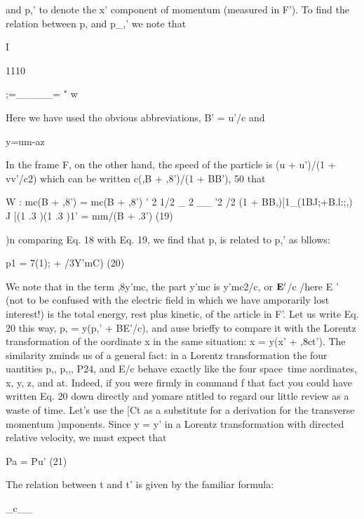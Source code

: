 and p,' to denote the x' component of momentum (measured in F').
To find the relation between p, and p_,' we note that

I

1110

;=_____= " w

Here we have used the obvious abbreviations, B' = u'/c and

y=um-az

In the frame F, on the other hand, the speed of the particle is
(u + u')/(1 + vv'/c2) which can be written c(,B + ,8')/(1 + BB'),
50 that
\begin{equation}
\end{equation}

W : mc(B + ,8') = mc(B + ,8')
' 2 1/2 _ 2 __ '2 /2
(1 + BB,)[1_(1BJ;+B.l:;,) J [(1 .3 )(1 .3 )1'
= mm/(B + .3') (19)
\begin{equation}
\end{equation}

)n comparing Eq. 18 with Eq. 19, we find that p, is related to p,' as
bllows:

p1 = 7(1); + /3Y'mC) (20)
\begin{equation}
\end{equation}

We note that in the term ,8y'mc, the part y'mc is y'mc2/c, or $\mathbf{E}'$/c
/here E ' (not to be confused with the electric field in which we have
amporarily lost interest!) is the total energy, rest plus kinetic, of the
article in F'. Let us write Eq. 20 this way, p, = y(p,' + BE'/c), and
ause brieffy to compare it with the Lorentz transformation of the
oordinate x in the same situation: x = y(x' + ,8ct'). The similarity
zminds us of a general fact: in a Lorentz transformation the four
uantities p,, p,,, P24, and E/c behave exactly like the four space~time
aordinates, x, y, z, and at. Indeed, if you were firmly in command
f that fact you could have written Eq. 20 down directly and yomare
ntitled to regard our little review as a waste of time. Let's use the
[Ct as a substitute for a derivation for the transverse momentum
)mponents. Since y = y' in a Lorentz transformation with
directed relative velocity, we must expect that

Pa = Pu' (21)
\begin{equation}
\end{equation}

The relation between t and t' is given by the familiar formula:

_c__

